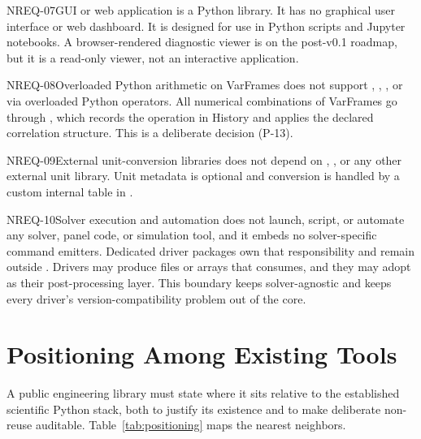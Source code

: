 \begin{nreqbox}{NREQ-07}{GUI or web application}
\itc{} is a Python library. It has no graphical user interface or web
dashboard. It is designed for use in Python scripts and Jupyter notebooks.
A browser-rendered diagnostic viewer is on the post-v0.1 roadmap, but it is
a read-only viewer, not an interactive application.
\end{nreqbox}

\begin{nreqbox}{NREQ-08}{Overloaded Python arithmetic on VarFrames}
\itc{} does not support , , ,
or  via overloaded Python operators. All numerical
combinations of VarFrames go through , which
records the operation in History and applies the declared correlation
structure. This is a deliberate decision (P-13).
\end{nreqbox}

\begin{nreqbox}{NREQ-09}{External unit-conversion libraries}
\itc{} does not depend on , , or any other
external unit library. Unit metadata is optional and conversion is handled
by a custom internal table in .
\end{nreqbox}

\begin{nreqbox}{NREQ-10}{Solver execution and automation}
\itc{} does not launch, script, or automate any solver, panel code, or
simulation tool, and it embeds no solver-specific command emitters.
Dedicated driver packages own that responsibility and remain outside
\itc{}. Drivers may produce files or arrays that  consumes,
and they may adopt \itc{} as their post-processing layer. This boundary
keeps \itc{} solver-agnostic and keeps every driver's version-compatibility
problem out of the \itc{} core.
\end{nreqbox}

\section{Positioning Among Existing Tools}
\label{sec:positioning}

A public engineering library must state where it sits relative to the
established scientific Python stack, both to justify its existence and to
make deliberate non-reuse auditable. Table~\ref{tab:positioning} maps the
nearest neighbors.

